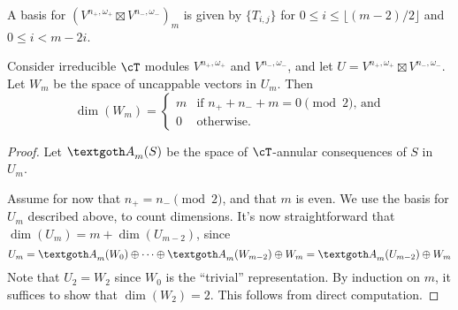 \documentclass{article}
\begin{document}
\begin{fact}
A basis for $\left(V^{n_+, \omega_+} \boxtimes V^{n_-, \omega_-}\right)_m$ is given by $\{T_{i,j}\}$ for $0 \leq i \leq \lfloor (m-2)/2 \rfloor$ and $0 \leq i < m - 2i$.
\end{fact}

\begin{lem}
Consider irreducible $\cT$ modules $V^{n_+, \omega_+}$ and $V^{n_-, \omega_-}$, and let $U=V^{n_+, \omega_+} \boxtimes V^{n_-, \omega_-}$.
Let $W_m$ be the space of uncappable vectors in $U_m$.
Then $$\dim(W_m)=\begin{cases} m & \text{if $n_+ + n_- + m = 0 \pmod 2$, and} \\ 0 & \text{otherwise.}\end{cases}$$
\end{lem}
\begin{proof}
Let $\gA_m(S)$ be the space of $\cT$-annular consequences of $S$ in $U_m$.

Assume for now that $n_+ = n_- \pmod 2$, and that $m$ is even. 
We use the basis for $U_m$ described above, to count dimensions.
It's now straightforward that $\dim(U_m)=m+\dim(U_{m-2})$, since
$$
U_{m}
=
\gA_m(W_0)\oplus\cdots\oplus \gA_m(W_{m-2})\oplus W_m 
= 
\gA_m(U_{m-2})\oplus W_m
$$
Note that $U_{2}=W_{2}$ since $W_{0}$ is the ``trivial'' representation. 
By induction on $m$, it suffices to show that $\dim(W_{2})=2$.  
This follows from direct computation.
\end{proof}
\end{document}
